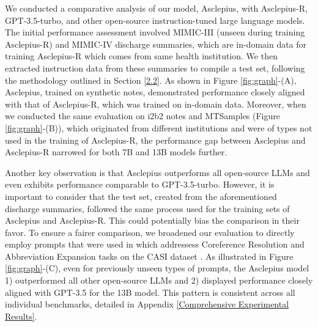 \documentclass[11pt]{article}
\begin{document}
We conducted a comparative analysis of our model, Asclepius, with Asclepius-R, GPT-3.5-turbo, and other open-source instruction-tuned large language models.
The initial performance assessment involved MIMIC-III (unseen during training Asclepius-R) and MIMIC-IV discharge summaries, which are in-domain data for training Asclepius-R which comes from same health institution. 
We then extracted instruction data from these summaries to compile a test set, following the methodology outlined in Section \ref{2.2}.
As shown in Figure \ref{fig:graph}-(A), Asclepius, trained on synthetic notes, demonstrated performance closely aligned with that of Asclepius-R, which was trained on in-domain data.
Moreover, when we conducted the same evaluation on i2b2 notes and MTSamples (Figure \ref{fig:graph}-(B)), which originated from different institutions and were of types not used in the training of Asclepius-R, the performance gap between Asclepius and Asclepius-R narrowed for both 7B and 13B models further.

Another key observation is that Asclepius outperforms all open-source LLMs and even exhibits performance comparable to GPT-3.5-turbo.
However, it is important to consider that the test set, created from the aforementioned discharge summaries, followed the same process used for the training sets of Asclepius and Asclepius-R. 
This could potentially bias the comparison in their favor.
To ensure a fairer comparison, we broadened our evaluation to directly employ prompts that were used in \citet{agrawal2022large} which addressess Coreference Resolution and Abbreviation Expansion tasks on the CASI dataset \citep{moon2014sense}.
As illustrated in Figure \ref{fig:graph}-(C), even for previously unseen types of prompts, the Asclepius model 1) outperformed all other open-source LLMs and 2) displayed performance closely aligned with GPT-3.5 for the 13B model.
This pattern is consistent across all individual benchmarks, detailed in Appendix \ref{Comprehensive Experimental Results}. 
\end{document}
